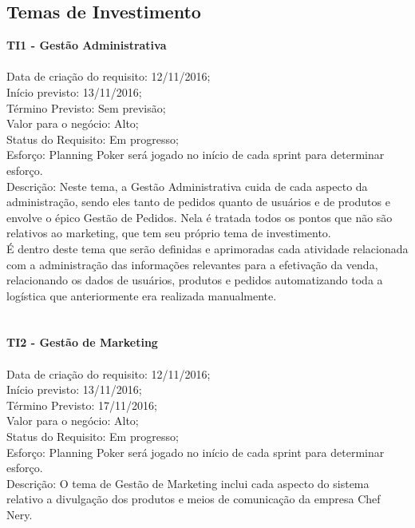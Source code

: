 \begin{apendicesenv}
{\large {\subsection { Temas de Investimento\\ } } }


\textbf{TI1 - Gestão Administrativa} \\
\tab \\
\tab Data de criação do requisito: 12/11/2016;\\
\tab Início previsto: 13/11/2016;\\
\tab Término Previsto: Sem previsão;\\
\tab Valor para o negócio: Alto;\\
\tab Status do Requisito: Em progresso;\\
\tab Esforço: Planning Poker será jogado no início de cada sprint para determinar esforço.\\
\tab Descrição: Neste tema, a Gestão Administrativa cuida de cada aspecto da administração, sendo eles tanto de pedidos quanto de usuários e de produtos e envolve o épico Gestão de Pedidos. Nela é tratada todos os pontos que não são relativos ao marketing, que tem seu próprio tema de investimento.\\
\tab É dentro deste tema que serão definidas e aprimoradas cada atividade relacionada com a administração das informações relevantes para a efetivação da venda, relacionando os dados de usuários, produtos e pedidos automatizando toda a logística que anteriormente era realizada manualmente.\\
\\
\tab \\
\textbf{TI2 - Gestão de Marketing} \\
\tab \\
\tab Data de criação do requisito: 12/11/2016;\\
\tab Início previsto: 13/11/2016;\\
\tab Término Previsto: 17/11/2016;\\
\tab Valor para o negócio: Alto;\\
\tab Status do Requisito: Em progresso;\\
\tab Esforço: Planning Poker será jogado no início de cada sprint para determinar esforço.\\
\tab Descrição:  O tema de Gestão de Marketing inclui cada aspecto do sistema relativo a divulgação dos produtos e meios de comunicação da empresa Chef Nery.\\
\\


\end{apendicesenv}
